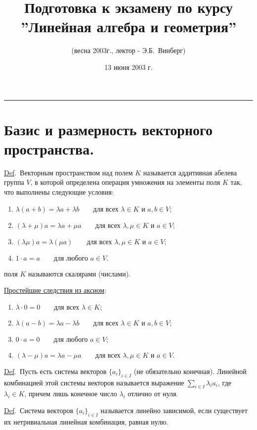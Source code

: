 \documentclass[draft]{article}%
\newcommand{\de}{\par\noindent\underline{Def}.\ }%
\newcommand{\ab}{\par\noindent}%
\begin{document}
%
\title{Подготовка к экзамену по курсу \\ ''Линейная алгебра и геометрия''}%
\author{(весна 2003г., лектор - Э.Б.~Винберг)}%
\date{13 июня 2003 г.}%
\maketitle%
\hrule%
\section{Базис и размерность векторного пространства.}%
\label{q1}%
\par\de Векторным пространством над полем $K$ называется аддитивная абелева группа $V$, в которой определена
операция умножения на элементы поля $K$ так, что выполнены следующие условия:
\begin{enumerate}
    \item $\lambda(a+b)=\lambda a+\lambda b \qquad \mbox{для всех } \lambda\in K \mbox{ и }a, b\in V;$
    \item $(\lambda+\mu)a=\lambda a+\mu a \qquad\mbox{для всех }\lambda, \mu\in K\mbox{ и }a\in V;$
    \item $(\lambda\mu)a=\lambda(\mu a) \qquad\mbox{для всех }\lambda, \mu\in K\mbox{ и }a\in V;$
    \item $1\cdot a=a\qquad\mbox{для любого }a\in V.$
\end{enumerate}
 поля $K$ называются скалярами (числами).%
\ab\underline{Простейшие следствия из аксиом}:
\begin{enumerate}
    \item $\lambda\cdot 0=0\qquad\mbox{для всех }\lambda\in K;$
    \item $\lambda(a-b)=\lambda a-\lambda b\qquad\mbox{для всех }\lambda\in K \mbox{ и }a, b\in V;$
    \item $0\cdot a=0\qquad\mbox{для любого }a\in V;$
    \item $(\lambda-\mu)a=\lambda a-\mu a\qquad\mbox{для всех }\lambda,\mu\in K\mbox{ и }a\in V.$
\end{enumerate}
\de Пусть есть система векторов $\{a_i\} _{i\in I}$ (не обязательно конечная). Линейной комбинацией этой
системы векторов называется выражение $\sum\limits_{i\in I} \lambda_i a_i$, где $\lambda_i\in K$, причем лишь
конечное
число $\lambda_i$ отлично от нуля. %

\de Система векторов $\{a_i\}_{i\in I}$ называется линейно зависимой, если существует их нетривиальная линейная
комбинация, равная нулю. %
\end{document}
